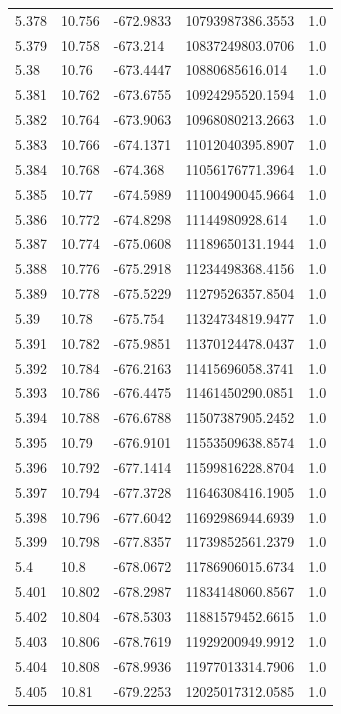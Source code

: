 \begin{tabular}{lllll}
5.378 & 10.756 & -672.9833 & 10793987386.3553 & 1.0 \\
5.379 & 10.758 & -673.214 & 10837249803.0706 & 1.0 \\
5.38 & 10.76 & -673.4447 & 10880685616.014 & 1.0 \\
5.381 & 10.762 & -673.6755 & 10924295520.1594 & 1.0 \\
5.382 & 10.764 & -673.9063 & 10968080213.2663 & 1.0 \\
5.383 & 10.766 & -674.1371 & 11012040395.8907 & 1.0 \\
5.384 & 10.768 & -674.368 & 11056176771.3964 & 1.0 \\
5.385 & 10.77 & -674.5989 & 11100490045.9664 & 1.0 \\
5.386 & 10.772 & -674.8298 & 11144980928.614 & 1.0 \\
5.387 & 10.774 & -675.0608 & 11189650131.1944 & 1.0 \\
5.388 & 10.776 & -675.2918 & 11234498368.4156 & 1.0 \\
5.389 & 10.778 & -675.5229 & 11279526357.8504 & 1.0 \\
5.39 & 10.78 & -675.754 & 11324734819.9477 & 1.0 \\
5.391 & 10.782 & -675.9851 & 11370124478.0437 & 1.0 \\
5.392 & 10.784 & -676.2163 & 11415696058.3741 & 1.0 \\
5.393 & 10.786 & -676.4475 & 11461450290.0851 & 1.0 \\
5.394 & 10.788 & -676.6788 & 11507387905.2452 & 1.0 \\
5.395 & 10.79 & -676.9101 & 11553509638.8574 & 1.0 \\
5.396 & 10.792 & -677.1414 & 11599816228.8704 & 1.0 \\
5.397 & 10.794 & -677.3728 & 11646308416.1905 & 1.0 \\
5.398 & 10.796 & -677.6042 & 11692986944.6939 & 1.0 \\
5.399 & 10.798 & -677.8357 & 11739852561.2379 & 1.0 \\
5.4 & 10.8 & -678.0672 & 11786906015.6734 & 1.0 \\
5.401 & 10.802 & -678.2987 & 11834148060.8567 & 1.0 \\
5.402 & 10.804 & -678.5303 & 11881579452.6615 & 1.0 \\
5.403 & 10.806 & -678.7619 & 11929200949.9912 & 1.0 \\
5.404 & 10.808 & -678.9936 & 11977013314.7906 & 1.0 \\
5.405 & 10.81 & -679.2253 & 12025017312.0585 & 1.0 \\

\end{tabular}
